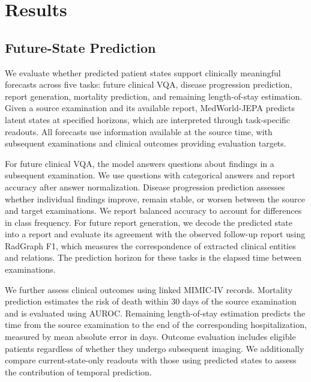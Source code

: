 \section{Results}
\label{sec:results}







\subsection{Future-State Prediction}

We evaluate whether predicted patient states support clinically meaningful forecasts across five tasks: future clinical VQA, disease progression prediction, report generation, mortality prediction, and remaining length-of-stay estimation. Given a source examination and its available report, MedWorld-JEPA predicts latent states at specified horizons, which are interpreted through task-specific readouts. All forecasts use information available at the source time, with subsequent examinations and clinical outcomes providing evaluation targets.

For future clinical VQA, the model answers questions about findings in a subsequent examination. We use questions with categorical answers and report accuracy after answer normalization. Disease progression prediction assesses whether individual findings improve, remain stable, or worsen between the source and target examinations. We report balanced accuracy to account for differences in class frequency. For future report generation, we decode the predicted state into a report and evaluate its agreement with the observed follow-up report using RadGraph F1, which measures the correspondence of extracted clinical entities and relations. The prediction horizon for these tasks is the elapsed time between examinations.

We further assess clinical outcomes using linked MIMIC-IV records. Mortality prediction estimates the risk of death within 30 days of the source examination and is evaluated using AUROC. Remaining length-of-stay estimation predicts the time from the source examination to the end of the corresponding hospitalization, measured by mean absolute error in days. Outcome evaluation includes eligible patients regardless of whether they undergo subsequent imaging. We additionally compare current-state-only readouts with those using predicted states to assess the contribution of temporal prediction.

